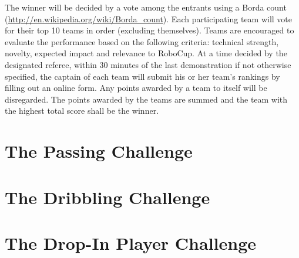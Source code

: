 \documentclass{article}
\begin{document}
The winner will be decided by a vote among the entrants using a Borda
count (\url{http://en.wikipedia.org/wiki/Borda_count}). Each participating 
team will vote for their top 10 teams in order (excluding themselves).
Teams are encouraged to evaluate the performance based on the
following criteria: technical strength, novelty, expected impact and
relevance to RoboCup. At a time decided by the designated referee,
within 30 minutes of the last demonstration if not otherwise
specified, the captain of each team will submit his or her team's rankings 
by filling out an online form.  Any points awarded by a team to itself will be 
disregarded. The points awarded by the teams are summed and the team with the 
highest total score shall be the winner.

\section{The Passing Challenge}
\label{sec:passing}

\section{The Dribbling Challenge}
\label{sec:dribbling}

\section{The Drop-In Player Challenge}
\label{sec:dropIn}
\end{document}
